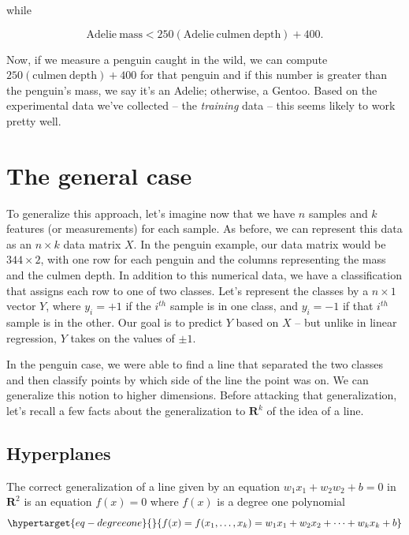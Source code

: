 \documentclass[
  11pt,
  letterpaper,
]{scrbook}
\theoremstyle{plain}
\theoremstyle{plain}
\theoremstyle{remark}
\begin{document}
while

\[
\mathrm{Adelie\ mass}<250(\mathrm{Adelie\ culmen\ depth})+400.
\]

Now, if we measure a penguin caught in the wild, we can compute
\(250(\mathrm{culmen\ depth})+400\) for that penguin and if this number
is greater than the penguin's mass, we say it's an Adelie; otherwise, a
Gentoo. Based on the experimental data we've collected -- the
\emph{training} data -- this seems likely to work pretty well.

\hypertarget{the-general-case}{%
\section{The general case}\label{the-general-case}}

To generalize this approach, let's imagine now that we have \(n\)
samples and \(k\) features (or measurements) for each sample. As before,
we can represent this data as an \(n\times k\) data matrix \(X\). In the
penguin example, our data matrix would be \(344\times 2\), with one row
for each penguin and the columns representing the mass and the culmen
depth. In addition to this numerical data, we have a classification that
assigns each row to one of two classes. Let's represent the classes by a
\(n\times 1\) vector \(Y\), where \(y_{i}=+1\) if the \(i^{th}\) sample
is in one class, and \(y_{i}=-1\) if that \(i^{th}\) sample is in the
other. Our goal is to predict \(Y\) based on \(X\) -- but unlike in
linear regression, \(Y\) takes on the values of \(\pm 1\).

In the penguin case, we were able to find a line that separated the two
classes and then classify points by which side of the line the point was
on. We can generalize this notion to higher dimensions. Before attacking
that generalization, let's recall a few facts about the generalization
to \(\mathbf{R}^{k}\) of the idea of a line.

\hypertarget{hyperplanes}{%
\subsection{Hyperplanes}\label{hyperplanes}}

The correct generalization of a line given by an equation
\(w_1 x_1+ w_2 w_2+b=0\) in \(\mathbf{R}^{2}\) is an equation \(f(x)=0\)
where \(f(x)\) is a degree one polynomial
\begin{equation}\protect\hypertarget{eq-degreeone}{}{
f(x) = f(x_1,\ldots, x_k) = w_1 x_1 + w_2 x_2 +\cdots + w_k x_k + b 
}\label{eq-degreeone}\end{equation}
\end{document}
